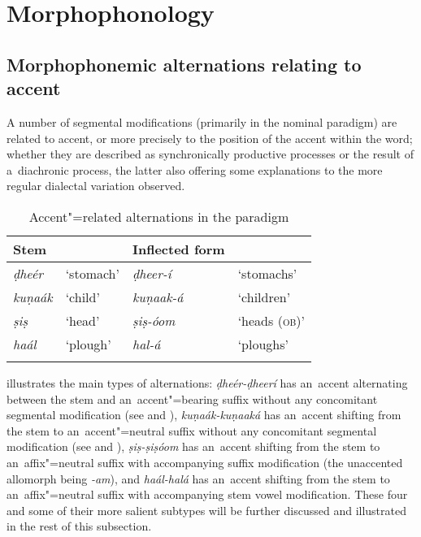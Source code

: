 \section[Morphophonology]{Morphophonology{\protect\footnotemark}}
\label{sec:3-5}


\subsection{Morphophonemic alternations relating to accent}
\label{subsec:3-5-1}

A number of segmental modifications (primarily in the nominal paradigm) are related to accent, or more precisely to the position of the accent within the word; whether they are described as synchronically productive processes or the result of a~diachronic process, the latter also offering some explanations to the more regular dialectal variation observed. 


\begin{table}[ht]
\caption{ Accent"=related alternations in the paradigm}
\begin{tabularx}{\textwidth}{ l@{\hspace{30pt}} Q Q Q }
\lsptoprule
Stem &
&
Inflected form &
\\\hline
\textit{ḍheér} &
`stomach' &
\textit{ḍheer-í} &
`stomachs'\\
\textit{kuṇaák} &
`child' &
\textit{kuṇaak-á} &
`children'\\
\textit{ṣiṣ} &
`head' &
\textit{ṣiṣ-óom} &
`heads (\textsc{ob)}'\\
\textit{haál} &
`plough' &
\textit{hal-á} &
`ploughs'\\\lspbottomrule
\end{tabularx}
\label{tab:3-7}
\end{table}


 illustrates the main types of alternations: \textit{ḍheér-ḍheerí} has an~accent alternating between the stem and an~accent"=bearing suffix without any concomitant segmental modification (see  and ), \textit{kuṇaák-kuṇaaká} has an~accent shifting from the stem to an~accent"=neutral suffix without any concomitant segmental modification (see  and ), \textit{ṣiṣ-ṣiṣóom} has an~accent shifting from the stem to an~affix"=neutral suffix with accompanying suffix modification (the unaccented allomorph being \textit{-am}), and \textit{haál-halá} has an~accent shifting from the stem to an~affix"=neutral suffix with accompanying stem vowel modification. These four and some of their more salient subtypes will be further discussed and illustrated in the rest of this subsection.


